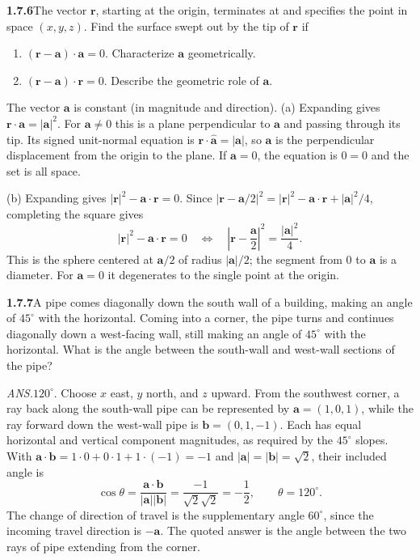 \par\bigskip
\noindent\textbf{1.7.6}\quad The vector $\mathbf{r}$, starting at the origin,
terminates at and specifies the point in space $(x,y,z)$. Find the surface
swept out by the tip of $\mathbf{r}$ if
\begin{enumerate}
\item[(a)] $(\mathbf{r}-\mathbf{a})\cdot\mathbf{a}=0$. Characterize
  $\mathbf{a}$ geometrically.
\item[(b)] $(\mathbf{r}-\mathbf{a})\cdot\mathbf{r}=0$. Describe the geometric
  role of $\mathbf{a}$.
\end{enumerate}
The vector $\mathbf{a}$ is constant (in magnitude and direction).
\solution
(a) Expanding gives $\mathbf r\cdot\mathbf a=|\mathbf a|^2$.
For $\mathbf a\ne0$ this is a plane perpendicular to $\mathbf a$ and
passing through its tip. Its signed unit-normal equation is
$\mathbf r\cdot\widehat{\mathbf a}=|\mathbf a|$, so $\mathbf a$
is the perpendicular displacement from the origin to the plane.
If $\mathbf a=0$, the equation is $0=0$ and the set is all space.

(b) Expanding gives $|\mathbf r|^2-\mathbf a\cdot\mathbf r=0$.
Since $|\mathbf r-\mathbf a/2|^2=|\mathbf r|^2-\mathbf a\cdot\mathbf r
+|\mathbf a|^2/4$, completing the square gives
\[
 |\mathbf r|^2-\mathbf a\cdot\mathbf r=0
 \quad\Longleftrightarrow\quad
 \left|\mathbf r-\frac{\mathbf a}{2}\right|^2
       =\frac{|\mathbf a|^2}{4}.
\]
This is the sphere centered at $\mathbf a/2$ of radius $|\mathbf a|/2$;
the segment from $0$ to $\mathbf a$ is a diameter. For $\mathbf a=0$
it degenerates to the single point at the origin.


\par\bigskip
\noindent\textbf{1.7.7}\quad A pipe comes diagonally down the south wall of a
building, making an angle of $45^{\circ}$ with the horizontal. Coming into a
corner, the pipe turns and continues diagonally down a west-facing wall, still
making an angle of $45^{\circ}$ with the horizontal. What is the angle between
the south-wall and west-wall sections of the pipe?
\par\nobreak\hfill\emph{ANS.}\enspace $120^{\circ}$.
\solution
Choose $x$ east, $y$ north, and $z$ upward. From the southwest corner,
a ray back along the south-wall pipe can be represented by
$\mathbf a=(1,0,1)$, while the ray forward down the west-wall pipe is
$\mathbf b=(0,1,-1)$. Each has equal horizontal and vertical component
magnitudes, as required by the $45^\circ$ slopes. With
$\mathbf a\cdot\mathbf b=1\cdot0+0\cdot1+1\cdot(-1)=-1$ and
$|\mathbf a|=|\mathbf b|=\sqrt2$, their included angle is
\[
 \cos\theta=\frac{\mathbf a\cdot\mathbf b}{|\mathbf a||\mathbf b|}
            =\frac{-1}{\sqrt2\sqrt2}=-\frac12,
 \qquad\boxed{\theta=120^\circ}.
\]
The change of direction of travel is the supplementary angle $60^\circ$,
since the incoming travel direction is $-\mathbf a$. The quoted answer
is the angle between the two rays of pipe extending from the corner.


